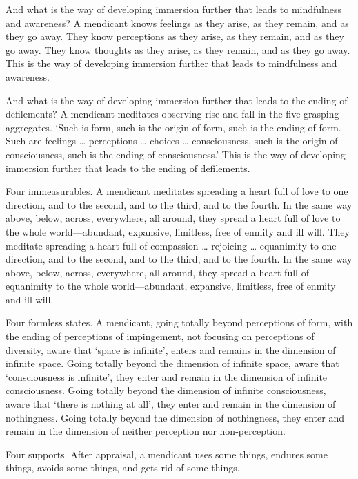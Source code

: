 \documentclass[12pt,openany]{book}%
\begin{document}
And what is the way of developing immersion further that leads to mindfulness and awareness? A mendicant knows feelings as they arise, as they remain, and as they go away. They know perceptions as they arise, as they remain, and as they go away. They know thoughts as they arise, as they remain, and as they go away. This is the way of developing immersion further that leads to mindfulness and awareness. 

And what is the way of developing immersion further that leads to the ending of defilements? A mendicant meditates observing rise and fall in the five grasping aggregates. ‘Such is form, such is the origin of form, such is the ending of form. Such are feelings … perceptions … choices … consciousness, such is the origin of consciousness, such is the ending of consciousness.’ This is the way of developing immersion further that leads to the ending of defilements. 

Four immeasurables. A mendicant meditates spreading a heart full of love to one direction, and to the second, and to the third, and to the fourth. In the same way above, below, across, everywhere, all around, they spread a heart full of love to the whole world—abundant, expansive, limitless, free of enmity and ill will. They meditate spreading a heart full of compassion … rejoicing … equanimity to one direction, and to the second, and to the third, and to the fourth. In the same way above, below, across, everywhere, all around, they spread a heart full of equanimity to the whole world—abundant, expansive, limitless, free of enmity and ill will. 

Four formless states. A mendicant, going totally beyond perceptions of form, with the ending of perceptions of impingement, not focusing on perceptions of diversity, aware that ‘space is infinite’, enters and remains in the dimension of infinite space. Going totally beyond the dimension of infinite space, aware that ‘consciousness is infinite’, they enter and remain in the dimension of infinite consciousness. Going totally beyond the dimension of infinite consciousness, aware that ‘there is nothing at all’, they enter and remain in the dimension of nothingness. Going totally beyond the dimension of nothingness, they enter and remain in the dimension of neither perception nor non-perception. 

Four supports. After appraisal, a mendicant uses some things, endures some things, avoids some things, and gets rid of some things. 
\end{document}
